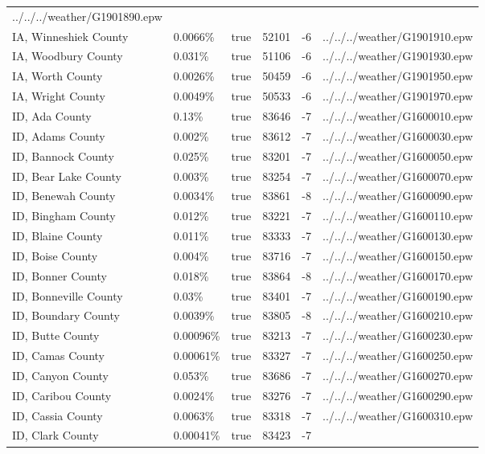 \begin{longtable}[]{@{}llllll@{}}
../../../weather/G1901890.epw \\
IA, Winneshiek County & 0.0066\% & true & 52101 & -6 &
../../../weather/G1901910.epw \\
IA, Woodbury County & 0.031\% & true & 51106 & -6 &
../../../weather/G1901930.epw \\
IA, Worth County & 0.0026\% & true & 50459 & -6 &
../../../weather/G1901950.epw \\
IA, Wright County & 0.0049\% & true & 50533 & -6 &
../../../weather/G1901970.epw \\
ID, Ada County & 0.13\% & true & 83646 & -7 &
../../../weather/G1600010.epw \\
ID, Adams County & 0.002\% & true & 83612 & -7 &
../../../weather/G1600030.epw \\
ID, Bannock County & 0.025\% & true & 83201 & -7 &
../../../weather/G1600050.epw \\
ID, Bear Lake County & 0.003\% & true & 83254 & -7 &
../../../weather/G1600070.epw \\
ID, Benewah County & 0.0034\% & true & 83861 & -8 &
../../../weather/G1600090.epw \\
ID, Bingham County & 0.012\% & true & 83221 & -7 &
../../../weather/G1600110.epw \\
ID, Blaine County & 0.011\% & true & 83333 & -7 &
../../../weather/G1600130.epw \\
ID, Boise County & 0.004\% & true & 83716 & -7 &
../../../weather/G1600150.epw \\
ID, Bonner County & 0.018\% & true & 83864 & -8 &
../../../weather/G1600170.epw \\
ID, Bonneville County & 0.03\% & true & 83401 & -7 &
../../../weather/G1600190.epw \\
ID, Boundary County & 0.0039\% & true & 83805 & -8 &
../../../weather/G1600210.epw \\
ID, Butte County & 0.00096\% & true & 83213 & -7 &
../../../weather/G1600230.epw \\
ID, Camas County & 0.00061\% & true & 83327 & -7 &
../../../weather/G1600250.epw \\
ID, Canyon County & 0.053\% & true & 83686 & -7 &
../../../weather/G1600270.epw \\
ID, Caribou County & 0.0024\% & true & 83276 & -7 &
../../../weather/G1600290.epw \\
ID, Cassia County & 0.0063\% & true & 83318 & -7 &
../../../weather/G1600310.epw \\
ID, Clark County & 0.00041\% & true & 83423 & -7 &

\end{longtable}
